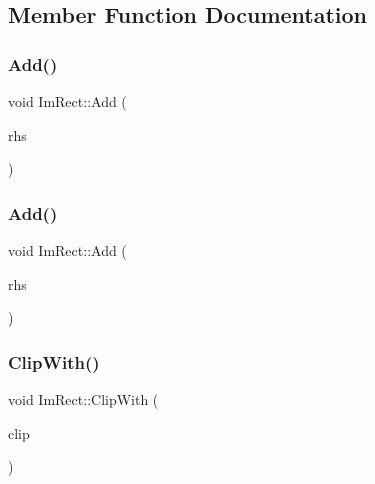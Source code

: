 \subsection{Member Function Documentation}
\hypertarget{struct_im_rect_a9d6cbef8c86ca01a16bb0fd35b457f88}{}\label{struct_im_rect_a9d6cbef8c86ca01a16bb0fd35b457f88} 
\subsubsection{\texorpdfstring{Add()}{Add()}\hspace{0.1cm}{\footnotesize\ttfamily [1/2]}}
{\footnotesize\ttfamily void Im\+Rect\+::\+Add (\begin{DoxyParamCaption}\item[{const \hyperlink{struct_im_vec2}{Im\+Vec2} \&}]{rhs }\end{DoxyParamCaption})}

\hypertarget{struct_im_rect_a9bcb65fd17843c74555291a522e9ebdf}{}\label{struct_im_rect_a9bcb65fd17843c74555291a522e9ebdf} 
\subsubsection{\texorpdfstring{Add()}{Add()}\hspace{0.1cm}{\footnotesize\ttfamily [2/2]}}
{\footnotesize\ttfamily void Im\+Rect\+::\+Add (\begin{DoxyParamCaption}\item[{const \hyperlink{struct_im_rect}{Im\+Rect} \&}]{rhs }\end{DoxyParamCaption})}

\hypertarget{struct_im_rect_a5e220ababe2fa079638aab8f4b0b8ace}{}\label{struct_im_rect_a5e220ababe2fa079638aab8f4b0b8ace} 
\subsubsection{\texorpdfstring{Clip\+With()}{ClipWith()}}
{\footnotesize\ttfamily void Im\+Rect\+::\+Clip\+With (\begin{DoxyParamCaption}\item[{const \hyperlink{struct_im_rect}{Im\+Rect} \&}]{clip }\end{DoxyParamCaption})}

\hypertarget{struct_im_rect_ac583156fd0e9306181fff5d120b262ea}{}\label{struct_im_rect_ac583156fd0e9306181fff5d120b262ea} 
